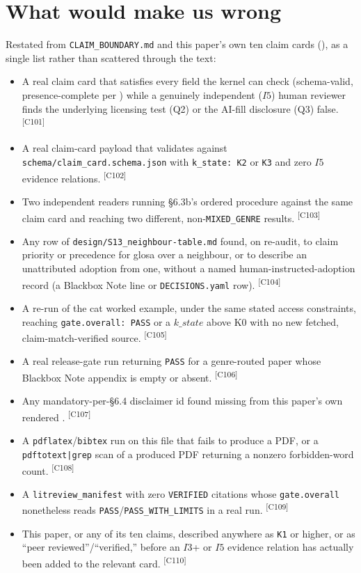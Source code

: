 \documentclass[11pt]{article}
\newcommand{\claimref}[1]{\textsuperscript{[#1]}}
\begin{document}
\section{What would make us wrong}
\label{sec:falsifiers}
Restated from \texttt{CLAIM\_BOUNDARY.md} and this paper's own ten claim cards
(), as a single list rather than scattered through the text:
\begin{itemize}
  \item A real claim card that satisfies every field the kernel can check (schema-valid,
    presence-complete per ) while a genuinely independent ($I5$) human
    reviewer finds the underlying licensing test (Q2) or the AI-fill disclosure (Q3) false.
    \claimref{C101}
  \item A real claim-card payload that validates against \texttt{schema/claim\_card.schema.json}
    with \texttt{k\_state: K2} or \texttt{K3} and zero $I5$ evidence relations. \claimref{C102}
  \item Two independent readers running \S6.3b's ordered procedure against the same claim card and
    reaching two different, non-\texttt{MIXED\_GENRE} results. \claimref{C103}
  \item Any row of \texttt{design/S13\_neighbour-table.md} found, on re-audit, to claim priority or
    precedence for glosa over a neighbour, or to describe an unattributed adoption from one,
    without a named human-instructed-adoption record (a Blackbox Note line or
    \texttt{DECISIONS.yaml} row). \claimref{C104}
  \item A re-run of the cat worked example, under the same stated access constraints, reaching
    \texttt{gate.overall: PASS} or a $k\_state$ above K0 with no new fetched, claim-match-verified
    source. \claimref{C105}
  \item A real release-gate run returning \texttt{PASS} for a genre-routed paper whose Blackbox
    Note appendix is empty or absent. \claimref{C106}
  \item Any mandatory-per-\S6.4 disclaimer id found missing from this paper's own rendered
    . \claimref{C107}
  \item A \texttt{pdflatex}/\texttt{bibtex} run on this file that fails to produce a PDF, or a
    \texttt{pdftotext|grep} scan of a produced PDF returning a nonzero forbidden-word count.
    \claimref{C108}
  \item A \texttt{litreview\_manifest} with zero \texttt{VERIFIED} citations whose
    \texttt{gate.overall} nonetheless reads \texttt{PASS}/\texttt{PASS\_WITH\_LIMITS} in a real
    run. \claimref{C109}
  \item This paper, or any of its ten claims, described anywhere as \texttt{K1} or higher, or as
    ``peer reviewed''/``verified,'' before an $I3$+ or $I5$ evidence relation has actually been
    added to the relevant card. \claimref{C110}
\end{itemize}
\end{document}
